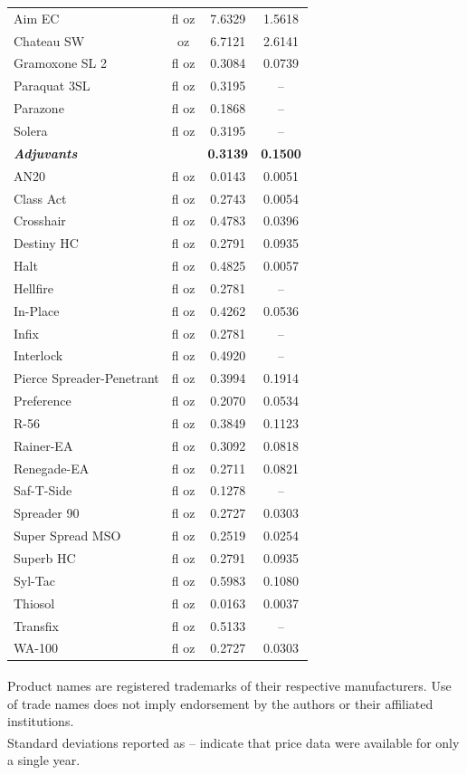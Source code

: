 \begin{table}[ht]
\begin{tabular}{lccc}
\hline
Aim EC & fl oz & 7.6329 & 1.5618 \\
Chateau SW & oz & 6.7121 & 2.6141 \\
Gramoxone SL 2 & fl oz & 0.3084 & 0.0739 \\
Paraquat 3SL & fl oz & 0.3195 & -- \\
Parazone & fl oz & 0.1868 & -- \\
Solera & fl oz & 0.3195 & -- \\
\hline
\textbf{\textit{Adjuvants}} & & \textbf{0.3139} & \textbf{0.1500} \\
\hline
AN20 & fl oz & 0.0143 & 0.0051 \\
Class Act & fl oz & 0.2743 & 0.0054 \\
Crosshair & fl oz & 0.4783 & 0.0396 \\
Destiny HC & fl oz & 0.2791 & 0.0935 \\
Halt & fl oz & 0.4825 & 0.0057 \\
Hellfire & fl oz & 0.2781 & -- \\
In-Place & fl oz & 0.4262 & 0.0536 \\
Infix & fl oz & 0.2781 & -- \\
Interlock & fl oz & 0.4920 & -- \\
Pierce Spreader-Penetrant & fl oz & 0.3994 & 0.1914 \\
Preference & fl oz & 0.2070 & 0.0534 \\
R-56 & fl oz & 0.3849 & 0.1123 \\
Rainer-EA & fl oz & 0.3092 & 0.0818 \\
Renegade-EA & fl oz & 0.2711 & 0.0821 \\
Saf-T-Side & fl oz & 0.1278 & -- \\
Spreader 90 & fl oz & 0.2727 & 0.0303 \\
Super Spread MSO & fl oz & 0.2519 & 0.0254 \\
Superb HC & fl oz & 0.2791 & 0.0935 \\
Syl-Tac & fl oz & 0.5983 & 0.1080 \\
Thiosol & fl oz & 0.0163 & 0.0037 \\
Transfix & fl oz & 0.5133 & -- \\
WA-100 & fl oz & 0.2727 & 0.0303 \\
\hline
\end{tabular}
\vspace{4pt}
\begin{flushleft}
\footnotesize
\textsuperscript{\dag} Product names are registered trademarks of their respective manufacturers. Use of trade names does not imply endorsement by the authors or their affiliated institutions.\\
\textsuperscript{\ddag} Standard deviations reported as -- indicate that price data were available for only a single year.
\end{flushleft}
\end{table}